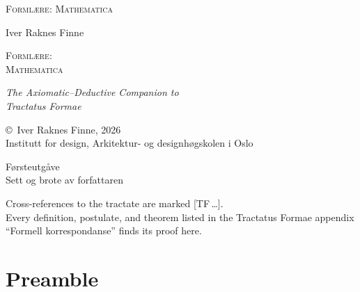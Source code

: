 \documentclass[10pt]{article}
\renewcommand{\footnotesize}{\fontsize{8pt}{10pt}\selectfont}
\renewcommand{\small}{\fontsize{9pt}{11pt}\selectfont}
\renewcommand{\normalsize}{\fontsize{10.5pt}{13pt}\selectfont}
\theoremstyle{definition}
\theoremstyle{plain}
\theoremstyle{remark}
\newcommand{\TF}[1]{\textnormal{[TF\,#1]}}  %
\begin{document}
\thispagestyle{empty}
\vspace*{5cm}
\begin{center}
{\fontsize{14pt}{17pt}\selectfont\scshape Forml\ae re: Mathematica}
\end{center}
\newpage

\thispagestyle{empty}
\vspace*{3cm}
\begin{center}
{\normalsize Iver Raknes Finne}

\vspace{1.5cm}
{\fontsize{22pt}{26pt}\selectfont\scshape Forml\ae re:\\[6pt]
Mathematica}

\vspace{0.6cm}
{\normalsize\itshape The Axiomatic--Deductive Companion to\\[3pt]
Tractatus Formae}
\end{center}
\vfill
\begin{center}
{\small 2026}
\end{center}
\newpage

\thispagestyle{empty}
\vspace*{\fill}
{\footnotesize
\copyright\ Iver Raknes Finne, 2026\\
Institutt for design, Arkitektur- og designh\o gskolen i Oslo

\medskip
F\o rsteutg\aa ve\\
Sett og brote av forfattaren

\medskip
Cross-references to the tractate are marked \TF{\ldots}.\\
Every definition, postulate, and theorem listed in the Tractatus Formae
appendix ``Formell korrespondanse'' finds its proof here.}
\newpage

\tableofcontents
\newpage

\section*{Preamble}
\end{document}
